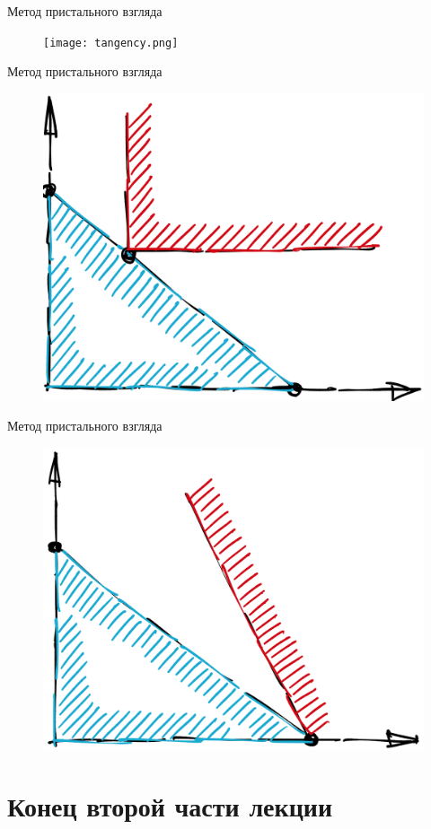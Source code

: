 \documentclass{beamer}
\begin{document}
\begin{frame}{Метод пристального взгляда}

\begin{figure}[hbt]
\centering
\texttt{[image: tangency.png]}
\end{figure}

\end{frame}
\begin{frame}{Метод пристального взгляда}

\begin{figure}[hbt]
\centering
\includegraphics[width=.8 \textwidth]{tang2.png}
\end{figure}

\end{frame}
\begin{frame}{Метод пристального взгляда}

\begin{figure}[hbt]
\centering
\includegraphics[width=.8 \textwidth]{tang3.png}
\end{figure}

\end{frame}

\section{Конец второй части лекции}
\end{document}
